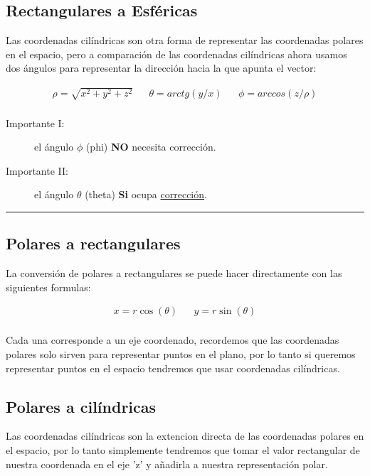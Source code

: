 \documentclass{article}
\begin{document}
\subsection{Rectangulares a Esféricas}
\label{sec:orgcfb119f}
Las coordenadas cilíndricas son otra forma de representar las coordenadas polares en el espacio, pero a comparación de las coordenadas cilíndricas ahora usamos dos ángulos para representar la dirección hacia la que apunta el vector: 

\[\begin{aligned}
 \rho = \sqrt{x^2+y^2+z^2} && 
 \theta = arctg\left( y/x \right)  &&
 \phi = arccos\left( z/\rho \right) \\
\end{aligned}\] 

\begin{description}
\item[{Importante I:}] el ángulo \(\phi\) (phi) \textbf{NO} necesita corrección.
\item[{Importante II:}] el ángulo \(\theta\) (theta) \textbf{Si} ocupa \hyperref[tab:org97f36ce]{corrección}.
\end{description}

\noindent\rule{\textwidth}{0.5pt}

\subsection{Polares a rectangulares}
\label{sec:org48b1055}
La conversión de polares a rectangulares se puede hacer directamente con las siguientes formulas: 

\[\begin{aligned}
 x = r \cos(\theta) && y = r \sin(\theta) \\
\end{aligned}\] 

Cada una corresponde a un eje coordenado, recordemos que las coordenadas polares solo sirven para representar puntos en el plano, por lo tanto si queremos representar puntos en el espacio tendremos que usar coordenadas cilíndricas.

\subsection{Polares a cilíndricas}
\label{sec:orgd9740a3}
Las coordenadas cilíndricas son la extencion directa de las coordenadas polares en el espacio, por lo tanto simplemente tendremos que tomar el valor rectangular de nuestra coordenada en el eje 'z' y añadirla a nuestra representación polar.
\end{document}
